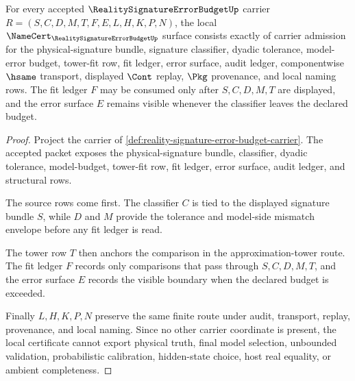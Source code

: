 \begin{theorem}
\label{thm:reality-signature-error-budget-namecert-obligations}
For every accepted $\RealitySignatureErrorBudgetUp$ carrier $R=(S,C,D,M,T,F,E,L,H,K,P,N)$, the local $\NameCert_{\RealitySignatureErrorBudgetUp}$ surface consists exactly of carrier admission for the physical-signature bundle, signature classifier, dyadic tolerance, model-error budget, tower-fit row, fit ledger, error surface, audit ledger, componentwise $\hsame$ transport, displayed $\Cont$ replay, $\Pkg$ provenance, and local naming rows. The fit ledger $F$ may be consumed only after $S,C,D,M,T$ are displayed, and the error surface $E$ remains visible whenever the classifier leaves the declared budget.
\end{theorem}
\begin{proof}
Project the carrier of \autoref{def:reality-signature-error-budget-carrier}. The accepted packet exposes the physical-signature bundle, classifier, dyadic tolerance, model-budget, tower-fit row, fit ledger, error surface, audit ledger, and structural rows.

The source rows come first. The classifier $C$ is tied to the displayed signature bundle $S$, while $D$ and $M$ provide the tolerance and model-side mismatch envelope before any fit ledger is read.

The tower row $T$ then anchors the comparison in the approximation-tower route. The fit ledger $F$ records only comparisons that pass through $S,C,D,M,T$, and the error surface $E$ records the visible boundary when the declared budget is exceeded.

Finally $L,H,K,P,N$ preserve the same finite route under audit, transport, replay, provenance, and local naming. Since no other carrier coordinate is present, the local certificate cannot export physical truth, final model selection, unbounded validation, probabilistic calibration, hidden-state choice, host real equality, or ambient completeness.
\end{proof}

